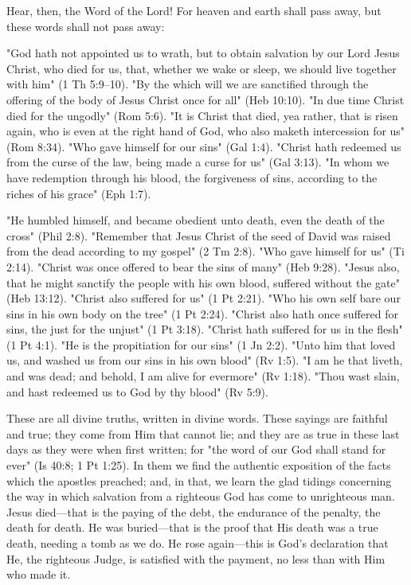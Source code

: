\documentclass[
]{book}
\begin{document}
Hear, then, the Word of the Lord! For heaven and earth shall pass away, but these words shall not pass away:

"God hath not appointed us to wrath, but to obtain salvation by our Lord Jesus Christ, who died for us, that, whether we wake or sleep, we should live together with him" (1 Th 5:9--10). "By the which will we are sanctified through the offering of the body of Jesus Christ once for all" (Heb 10:10). "In due time Christ died for the ungodly" (Rom 5:6). "It is Christ that died, yea rather, that is risen again, who is even at the right hand of God, who also maketh intercession for us" (Rom 8:34). "Who gave himself for our sins" (Gal 1:4). "Christ hath redeemed us from the curse of the law, being made a curse for us" (Gal 3:13). "In whom we have redemption through his blood, the forgiveness of sins, according to the riches of his grace" (Eph 1:7).

"He humbled himself, and became obedient unto death, even the death of the cross" (Phil 2:8). "Remember that Jesus Christ of the seed of David was raised from the dead according to my gospel" (2 Tm 2:8). "Who gave himself for us" (Ti 2:14). "Christ was once offered to bear the sins of many" (Heb 9:28). "Jesus also, that he might sanctify the people with his own blood, suffered without the gate" (Heb 13:12). "Christ also suffered for us" (1 Pt 2:21). "Who his own self bare our sins in his own body on the tree" (1 Pt 2:24). "Christ also hath once suffered for sins, the just for the unjust" (1 Pt 3:18). "Christ hath suffered for us in the flesh" (1 Pt 4:1). "He is the propitiation for our sins" (1 Jn 2:2). "Unto him that loved us, and washed us from our sins in his own blood" (Rv 1:5). "I am he that liveth, and was dead; and behold, I am alive for evermore" (Rv 1:18). "Thou wast slain, and hast redeemed us to God by thy blood" (Rv 5:9).

These are all divine truths, written in divine words. These sayings are faithful and true; they come from Him that cannot lie; and they are as true in these last days as they were when first written; for "the word of our God shall stand for ever" (Is 40:8; 1 Pt 1:25). In them we find the authentic exposition of the facts which the apostles preached; and, in that, we learn the glad tidings concerning the way in which salvation from a righteous God has come to unrighteous man. Jesus died---that is the paying of the debt, the endurance of the penalty, the death for death. He was buried---that is the proof that His death was a true death, needing a tomb as we do. He rose again---this is God's declaration that He, the righteous Judge, is satisfied with the payment, no less than with Him who made it.
\end{document}
